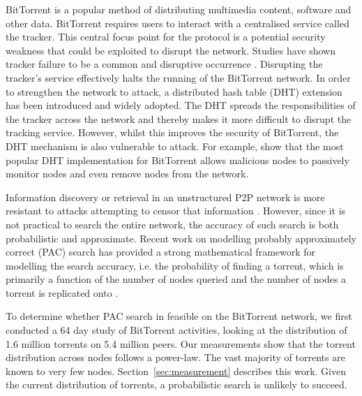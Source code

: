 BitTorrent is a popular method of distributing multimedia content, software and other data. BitTorrent requires users to interact with a centralised service called the tracker. This central focus point for the protocol is a potential security weakness that could be exploited to disrupt the network. Studies have shown tracker failure to be a common and disruptive occurrence \cite{Pouwelse2005}. Disrupting the tracker's service effectively halts the running of the BitTorrent network. In order to strengthen the network to attack, a distributed hash table (DHT) extension has been introduced and widely adopted. The DHT spreads the responsibilities of the tracker across the network and thereby makes it more difficult to disrupt the tracking service. However, whilst this improves the security of BitTorrent, the DHT mechanism is also vulnerable to attack. For example, \cite{Timpanaro2011,Sit2002} show that the most popular DHT implementation for BitTorrent allows malicious nodes to passively monitor nodes and even remove nodes from the network.

Information discovery or retrieval in an unstructured P2P network is more resistant to attacks attempting to censor that information \cite{Lua2005}. However, since it is not practical to search the entire network, the accuracy of such search is both probabilistic and approximate. Recent work on modelling probably approximately correct (PAC) search has provided a strong mathematical framework for modelling the search accuracy, i.e. the probability of finding a torrent, which is primarily a function of the number of nodes queried and the number of nodes a torrent is replicated onto \cite{Asthana2012,Cox,Cox2009}.

To determine whether PAC search in feasible on the BitTorrent network, we first conducted a 64 day study of BitTorrent activities, looking at the distribution of 1.6 million torrents on 5.4 million peers. Our measurements show that the torrent distribution across nodes follows a power-law. The vast majority of torrents are known to very few nodes. Section~\ref{sec:measurement} describes this work. Given the current distribution of torrents, a probabilistic search is unlikely to succeed.

